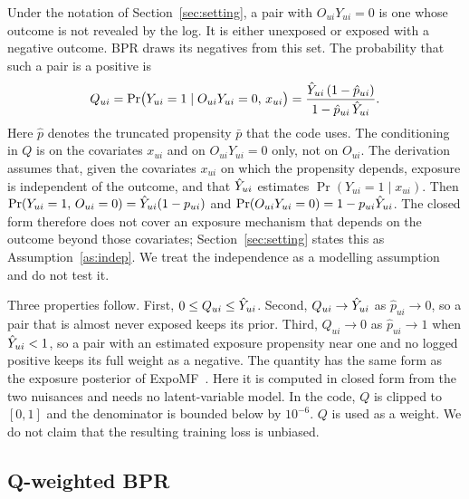 Under the notation of Section~\ref{sec:setting}, a pair with $O_{ui}Y_{ui}=0$ is one whose outcome is not
revealed by the log. It is either unexposed or exposed with a negative outcome. BPR draws its negatives
from this set. The probability that such a pair is a positive is
\begin{equation}\label{eq:posterior}
Q_{ui}=\Pr\bigl(Y_{ui}=1\mid O_{ui}Y_{ui}=0,\,x_{ui}\bigr)=\frac{\hat Y_{ui}\,(1-\hat p_{ui})}{1-\hat p_{ui}\,\hat Y_{ui}}.
\end{equation}
Here $\hat p$ denotes the truncated propensity $\bar p$ that the code uses. The conditioning in $Q$ is on the
covariates $x_{ui}$ and on $O_{ui}Y_{ui}=0$ only, not on $O_{ui}$. The derivation assumes that, given the covariates $x_{ui}$ on which the propensity depends,
exposure is independent of the outcome, and that $\hat Y_{ui}$ estimates $\Pr(Y_{ui}=1\mid x_{ui})$.
Then $\Pr(Y_{ui}=1,\,O_{ui}=0)=\hat Y_{ui}(1-p_{ui})$ and $\Pr(O_{ui}Y_{ui}=0)=1-p_{ui}\hat Y_{ui}$.
The closed form therefore does not cover an exposure mechanism that depends on the outcome beyond
those covariates; Section~\ref{sec:setting} states this as Assumption~\ref{as:indep}. We treat the independence as a
modelling assumption and do not test it.

Three properties follow. First, $0\le Q_{ui}\le\hat Y_{ui}$. Second, $Q_{ui}\to\hat Y_{ui}$ as
$\hat p_{ui}\to 0$, so a pair that is almost never exposed keeps its prior. Third,
$Q_{ui}\to 0$ as $\hat p_{ui}\to 1$ when $\hat Y_{ui}<1$, so a pair with an estimated exposure propensity near one
and no logged positive keeps its full weight as a negative. The quantity has the same form as the exposure
posterior of ExpoMF~\citep{liang2016exposure}. Here it is computed in closed form from the two
nuisances and needs no latent-variable model. In the code, $Q$ is clipped to $[0,1]$ and the
denominator is bounded below by $10^{-6}$. $Q$ is used as a weight. We do not claim that the
resulting training loss is unbiased.

\subsection{Q-weighted BPR}\label{sec:weighted}

